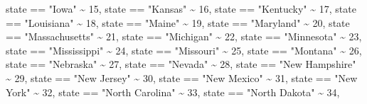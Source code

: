 \documentclass[
  letterpaper,
  DIV=11,
  numbers=noendperiod]{scrartcl}
\newenvironment{Shaded}{\begin{snugshade}}{\end{snugshade}}
\newcommand{\DecValTok}[1]{\textcolor[rgb]{0.68,0.00,0.00}{#1}}
\newcommand{\NormalTok}[1]{\textcolor[rgb]{0.00,0.23,0.31}{#1}}
\newcommand{\SpecialCharTok}[1]{\textcolor[rgb]{0.37,0.37,0.37}{#1}}
\newcommand{\StringTok}[1]{\textcolor[rgb]{0.13,0.47,0.30}{#1}}
\begin{document}
\begin{Shaded}
\begin{Highlighting}[]
\NormalTok{      state }\SpecialCharTok{==} \StringTok{"Iowa"} \SpecialCharTok{\textasciitilde{}} \DecValTok{15}\NormalTok{,}
\NormalTok{      state }\SpecialCharTok{==} \StringTok{"Kansas"} \SpecialCharTok{\textasciitilde{}} \DecValTok{16}\NormalTok{,}
\NormalTok{      state }\SpecialCharTok{==} \StringTok{"Kentucky"} \SpecialCharTok{\textasciitilde{}} \DecValTok{17}\NormalTok{,}
\NormalTok{      state }\SpecialCharTok{==} \StringTok{"Louisiana"} \SpecialCharTok{\textasciitilde{}} \DecValTok{18}\NormalTok{,}
\NormalTok{      state }\SpecialCharTok{==} \StringTok{"Maine"} \SpecialCharTok{\textasciitilde{}} \DecValTok{19}\NormalTok{,}
\NormalTok{      state }\SpecialCharTok{==} \StringTok{"Maryland"} \SpecialCharTok{\textasciitilde{}} \DecValTok{20}\NormalTok{,}
\NormalTok{      state }\SpecialCharTok{==} \StringTok{"Massachusetts"} \SpecialCharTok{\textasciitilde{}} \DecValTok{21}\NormalTok{,}
\NormalTok{      state }\SpecialCharTok{==} \StringTok{"Michigan"} \SpecialCharTok{\textasciitilde{}} \DecValTok{22}\NormalTok{,}
\NormalTok{      state }\SpecialCharTok{==} \StringTok{"Minnesota"} \SpecialCharTok{\textasciitilde{}} \DecValTok{23}\NormalTok{,}
\NormalTok{      state }\SpecialCharTok{==} \StringTok{"Mississippi"} \SpecialCharTok{\textasciitilde{}} \DecValTok{24}\NormalTok{,}
\NormalTok{      state }\SpecialCharTok{==} \StringTok{"Missouri"} \SpecialCharTok{\textasciitilde{}} \DecValTok{25}\NormalTok{,}
\NormalTok{      state }\SpecialCharTok{==} \StringTok{"Montana"} \SpecialCharTok{\textasciitilde{}} \DecValTok{26}\NormalTok{,}
\NormalTok{      state }\SpecialCharTok{==} \StringTok{"Nebraska"} \SpecialCharTok{\textasciitilde{}} \DecValTok{27}\NormalTok{,}
\NormalTok{      state }\SpecialCharTok{==} \StringTok{"Nevada"} \SpecialCharTok{\textasciitilde{}} \DecValTok{28}\NormalTok{,}
\NormalTok{      state }\SpecialCharTok{==} \StringTok{"New Hampshire"} \SpecialCharTok{\textasciitilde{}} \DecValTok{29}\NormalTok{,}
\NormalTok{      state }\SpecialCharTok{==} \StringTok{"New Jersey"} \SpecialCharTok{\textasciitilde{}} \DecValTok{30}\NormalTok{,}
\NormalTok{      state }\SpecialCharTok{==} \StringTok{"New Mexico"} \SpecialCharTok{\textasciitilde{}} \DecValTok{31}\NormalTok{,}
\NormalTok{      state }\SpecialCharTok{==} \StringTok{"New York"} \SpecialCharTok{\textasciitilde{}} \DecValTok{32}\NormalTok{,}
\NormalTok{      state }\SpecialCharTok{==} \StringTok{"North Carolina"} \SpecialCharTok{\textasciitilde{}} \DecValTok{33}\NormalTok{,}
\NormalTok{      state }\SpecialCharTok{==} \StringTok{"North Dakota"} \SpecialCharTok{\textasciitilde{}} \DecValTok{34}\NormalTok{,}

\end{Highlighting}
\end{Shaded}
\end{document}
